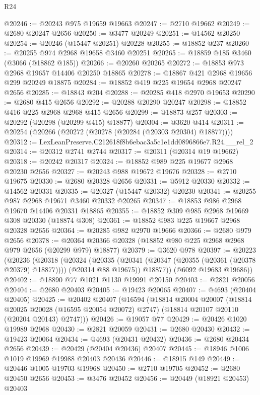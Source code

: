 \begin{lexlean}{R24}
\begin{coremodule}
@20246 := @20243 @975 @19659 @19663
@20247 := @2710 @19662
@20249 := @2680 @20247 @2656
@20250 := @3477 @20249
@20251 := @14562 @20250
@20254 := @20246 (@15447 @20251) @20228
@20255 := @18852 @237
@20260 := @20255 @974 @2968 @19658 @3460 @20251
@20265 := @18859 @185 @3460 (@3066 (@18862 @185))
@20266 := @20260 @20265
@20272 := @18853 @973 @2968 @19657 @14406 @20250 @18865
@20278 := @18867 @421 @2968 @19656 @299 @20249 @18875
@20284 := @18852 @419 @225 @19654 @2968 @20247 @2656
@20285 := @18843 @204
@20288 := @20285 @418 @2970 @19653
@20290 := @2680 @415 @2656
@20292 := @20288 @20290 @20247
@20298 := @18852 @416 @225 @2968 @2968 @415 @2656
@20299 := @18873 @257
@20303 := @20292 (@20298 (@20299 @415) @18877)
@20304 := @3620 @414
@20311 := @20254 (@20266 (@20272 (@20278 (@20284 (@20303 @20304) @18877))))
@20312 := LexLeanPreserve.C212618f8b6ebac3a5c1e1dd0896866e7.R24.__rel_2
@20314 := @20312 @2741 @2744
@20317 := @20311 (@20314 @19 @19662)
@20318 := @20242 @20317
@20324 := @18852 @989 @225 @19677 @2968 @20230 @2656
@20327 := @20243 @988 @19672 @19676
@20328 := @2710 @19675
@20330 := @2680 @20328 @2656
@20331 := @5912 @20330
@20332 := @14562 @20331
@20335 := @20327 (@15447 @20332) @20230
@20341 := @20255 @987 @2968 @19671 @3460 @20332 @20265
@20347 := @18853 @986 @2968 @19670 @14406 @20331 @18865
@20355 := @18852 @309 @985 @2968 @19669 @308 @20330 (@18874 @308)
@20361 := @18852 @983 @225 @19667 @2968 @20328 @2656
@20364 := @20285 @982 @2970 @19666
@20366 := @2680 @979 @2656
@20378 := @20364 @20366 @20328 (@18852 @980 @225 @2968 @2968 @979 @2656 (@20299 @979) @18877)
@20379 := @3620 @978
@20397 := @20223
    (@20236
      (@20318
        (@20324
          (@20335 (@20341 (@20347 (@20355 (@20361 (@20378 @20379) @18877)))) (@20314 @88 @19675))
          @18877))
      (@6092 @19683 @19686))
@20402 := @18890 @77 @1021 @1130 @19991 @20150
@20403 := @2821 @20056
@20404 := @2680 @20403
@20405 := @19423 @20065
@20407 := @4693 (@20404 @20405)
@20425 := @20402
    @20407
    (@16594
      (@18814
        @20004
        @20007
        (@18814 @20025 @20028 (@16595 @20054 @20072) @2747)
        (@18814 @20107 @20110 (@20204 @20143) @2747)))
@20426 := @19057 @77
@20429 := @20426 @1020 @19989 @2968
@20430 := @2821 @20059
@20431 := @2680 @20430
@20432 := @19423 @20064
@20434 := @4693 (@20431 @20432)
@20436 := @2680 @20434 @2656
@20439 := @20429 (@20404 @20436) @20407
@20445 := @18946 @1006 @1019 @19969 @19988 @20403 @20436
@20446 := @18915 @149
@20449 := @20446 @1005 @19703 @19968
@20450 := @2710 @19705
@20452 := @2680 @20450 @2656
@20453 := @3476 @20452
@20456 := @20449 (@18921 @20453) @20403

\end{coremodule}
\end{lexlean}
